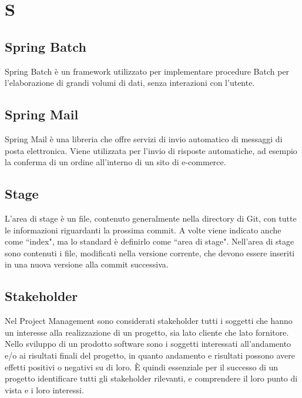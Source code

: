 \section{S}

    \subsection*{Spring Batch}

        Spring Batch è un framework utilizzato per implementare procedure Batch per l'elaborazione di grandi volumi di dati,
        senza interazioni con l'utente.

    \subsection*{Spring Mail}

        Spring Mail è una libreria che offre servizi di invio automatico di messaggi di posta elettronica.
        Viene utilizzata per l'invio di risposte automatiche, ad esempio la conferma di un ordine all'interno di un sito
        di e-commerce.

    \subsection*{Stage}

        L'area di stage è un file, contenuto generalmente nella directory di Git, con tutte le informazioni
        riguardanti la prossima commit.
        A volte viene indicato anche come ``index", ma lo standard è definirlo come ``area di stage".
        Nell'area di stage sono contenuti i file, modificati nella versione corrente, che devono essere inseriti in
        una nuova versione alla commit successiva.

    \subsection*{Stakeholder}

        Nel Project Management sono considerati stakeholder tutti i soggetti che hanno un interesse alla realizzazione
        di un progetto, sia lato cliente che lato fornitore.
        Nello sviluppo di un prodotto software sono i soggetti interessati all'andamento e/o ai risultati finali
        del progetto, in quanto andamento e risultati possono avere effetti positivi o negativi su di loro.
        È quindi essenziale per il successo di un progetto identificare tutti gli stakeholder rilevanti, e comprendere
        il loro punto di vista e i loro interessi.
